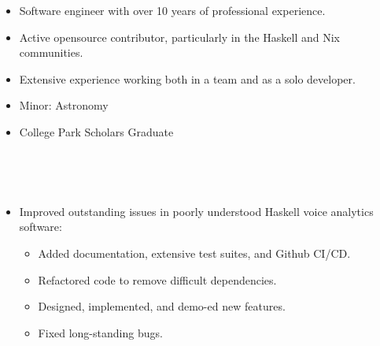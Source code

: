 \documentclass[10pt,a4paper,ragged2e,withhyper]{altacv}
\begin{document}
\begin{paracol}{2}


  \begin{itemize}
    \item Software engineer with over 10 years of professional experience.
    \item Active opensource contributor, particularly in the Haskell and Nix communities.
    \item Extensive experience working both in a team and as a solo developer.
  \end{itemize}


  \begin{itemize}
  \item Minor: Astronomy
  \item College Park Scholars Graduate
  \end{itemize}

   \\






   \\

\switchcolumn



\begin{itemize}
  \item Improved outstanding issues in poorly understood Haskell voice analytics software:
    \begin{itemize}
      \item Added documentation, extensive test suites, and Github CI/CD.
      \item Refactored code to remove difficult dependencies.
      \item Designed, implemented, and demo-ed new features.
      \item Fixed long-standing bugs.
    \end{itemize}
\end{itemize}


\end{paracol}
\end{document}
